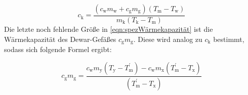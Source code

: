 \documentclass[titlepage = firstcover]{scrartcl}
\begin{document}
            \begin{equation}
                \label{eqn:spezWärmekapazität}
                c_\text{k} = \frac{(c_\text{w} m_\text{w} + c_\text{g} m_\text{g})(T_\text{m} - T_\text{w})}{m_\text{k}(T_\text{k} - T_\text{m})}
            \end{equation}
            Die letzte noch fehlende Größe in \eqref{eqn:spezWärmekapazität} ist die Wärmekapazität des Dewar-Gefäßes $c_\text{g}m_\text{g}$. Diese
            wird analog zu $c_{\text{k}}$ bestimmt, sodass sich folgende Formel ergibt:

            \begin{equation}
                \label{eqn:Wärmekapazität}
                c_\text{g} m_\text{g} = \frac{c_\text{w} m_\text{y}(T_\text{y} - T_\text{m}^{'}) - c_\text{w} m_\text{x}(T_\text{m}^{'} - T_\text{x})}{(T_\text{m}^{'} - T_\text{x})}
            \end{equation}
        
        
\end{document}
